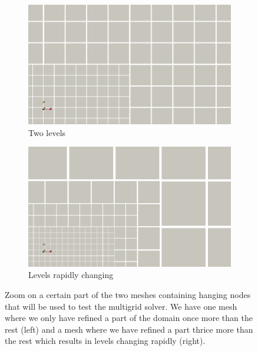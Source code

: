 \begin{figure}
\centering
\begin{subfigure}{.5\textwidth}
  \centering
  \includegraphics[width=0.8\linewidth]{Results/multi_mesh_hanging_1.png}
  \caption{Two levels}
  \label{multi_mesh_hanging_1}
\end{subfigure}%
\begin{subfigure}{.5\textwidth}
  \centering
  \includegraphics[width=0.8\linewidth]{Results/multi_mesh_hanging_2.png}
  \caption{Levels rapidly changing}
  \label{multi_mesh_hanging_2}
\end{subfigure}
\caption{Zoom on a certain part of the two meshes containing hanging nodes that will be used to test the multigrid solver. We have one mesh where we only have refined a part of the domain once more than the rest (left) and a mesh where we have refined a part thrice more than the rest which results in levels changing rapidly (right).}
\label{multi_mesh_hanging}
\end{figure}


